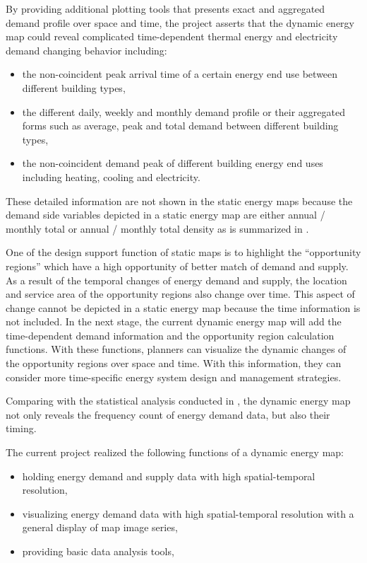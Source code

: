 By providing additional plotting tools that presents exact and
aggregated demand profile over space and time, the project asserts
that the dynamic energy map could reveal complicated time-dependent
thermal energy and electricity demand changing behavior including:
\begin{itemize}
\item the non-coincident peak arrival time of a certain energy end use
  between different building types,
\item the different daily, weekly and monthly demand profile or their
  aggregated forms such as average, peak and total demand between
  different building types,
\item the non-coincident demand peak of different building energy end
  uses including heating, cooling and electricity.
\end{itemize}

These detailed information are not shown in the static energy maps
because the demand side variables depicted in a static energy map are
either annual / monthly total or annual / monthly total density as is
summarized in . 

One of the design support function of static maps is to highlight the
``opportunity regions'' which have a high opportunity of better match
of demand and supply. As a result of the temporal changes of energy
demand and supply, the location and service area of the opportunity
regions also change over time. This aspect of change cannot be
depicted in a static energy map because the time information is not
included. In the next stage, the current dynamic energy map will add
the time-dependent demand information and the opportunity region
calculation functions. With these functions, planners can visualize
the dynamic changes of the opportunity regions over space and
time. With this information, they can consider more time-specific
energy system design and management strategies.

Comparing with the statistical analysis conducted in ,
the dynamic energy map not only reveals the frequency count of energy
demand data, but also their timing. 

The current project realized the following functions of a dynamic
energy map: 
\begin{itemize}
\item holding energy demand and supply data with high spatial-temporal
  resolution,
\item visualizing energy demand data with high spatial-temporal
  resolution with a general display of map image series,
\item providing basic data analysis tools,
\end{itemize}

